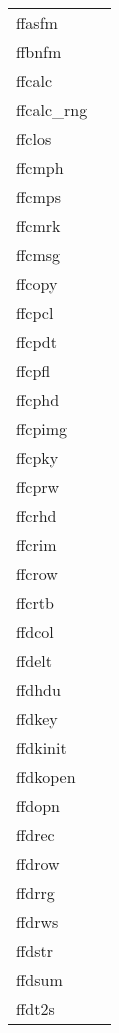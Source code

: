 \documentclass[11pt]{book}
\begin{document}
\newpage
\begin{tabular}{lr}
ffasfm    & \pageref{ffasfm} \\
ffbnfm   & \pageref{ffbnfm} \\
ffcalc     & \pageref{ffcalc} \\
ffcalc\_rng     & \pageref{ffcalcrng} \\
ffclos     & \pageref{ffclos} \\
ffcmph & \pageref{ffcmph} \\
ffcmps    & \pageref{ffcmps} \\
ffcmrk  & \pageref{ffpmrk} \\
ffcmsg  & \pageref{ffcmsg} \\
ffcopy     & \pageref{ffcopy} \\
ffcpcl     & \pageref{ffcpcl} \\
ffcpdt      & \pageref{ffcpdt} \\
ffcpfl      & \pageref{ffcpfl} \\
ffcphd   & \pageref{ffcphd} \\
ffcpimg  & \pageref{ffcpimg} \\
ffcpky       & \pageref{ffcpky} \\
ffcprw      &   \pageref{ffcprw} \\
ffcrhd     & \pageref{ffcrhd} \\
ffcrim     & \pageref{ffcrim} \\
ffcrow    & \pageref{ffcrow} \\
ffcrtb     & \pageref{ffcrtb} \\
ffdcol   & \pageref{ffdcol} \\
ffdelt    & \pageref{ffdelt} \\
ffdhdu     & \pageref{ffdhdu} \\
ffdkey     & \pageref{ffdkey} \\
ffdkinit  & \pageref{ffinit} \\
ffdkopen      & \pageref{ffopen} \\
ffdopn      & \pageref{ffopen} \\
ffdrec  & \pageref{ffdrec} \\
ffdrow  & \pageref{ffdrow} \\
ffdrrg  & \pageref{ffdrrg} \\
ffdrws & \pageref{ffdrws} \\
ffdstr     & \pageref{ffdkey} \\
ffdsum  & \pageref{ffdsum} \\
ffdt2s  & \pageref{ffdt2s} \\

\end{tabular}
\end{document}
